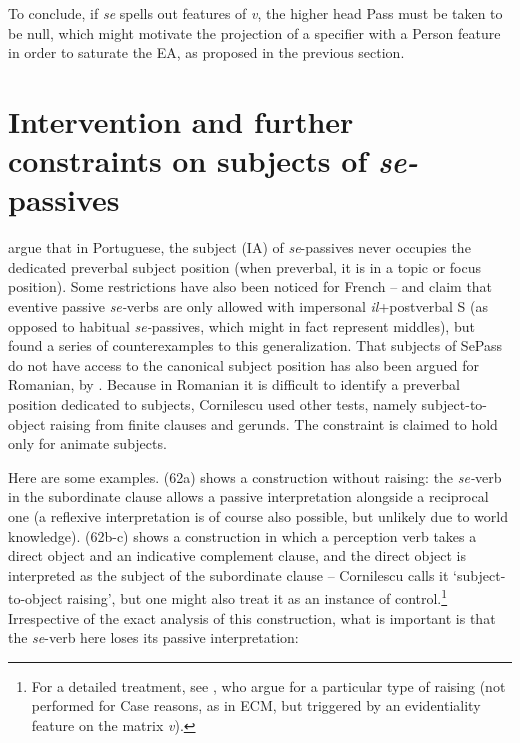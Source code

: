 \documentclass[output=paper]{langsci/langscibook}
\begin{document}
  To conclude, if \textit{se} spells out features of \textit{v}, the higher head Pass must be taken to be null, which might motivate the projection of a specifier with a Person feature in order to saturate the EA, as proposed in the previous section.

\section{Intervention and further constraints on subjects of \textit{se-}passives}%

\citet{Raposo1996} argue that in Portuguese, the subject (IA) of \textit{se}{}-passives never occupies the dedicated preverbal subject position (when preverbal, it is in a topic or focus position). Some restrictions have also been noticed for French – \citet{Stéfanini1962} and \citet{Ruwet1972} claim that eventive passive \textit{se-}verbs are only allowed with impersonal \textit{il}+postverbal S (as opposed to habitual \textit{se-}passives, which might in fact represent middles), but \citet{Zribi-Hertz1982,Zribi-Hertz2008} found a series of counterexamples to this generalization. That subjects of SePass do not have access to the canonical subject position has also been argued for Romanian, by \citet{Cornilescu1998}. Because in Romanian it is difficult to identify a preverbal position dedicated to subjects, Cornilescu used other tests, namely subject-to-object raising from finite clauses and gerunds. The constraint is claimed to hold only for animate subjects.

Here are some examples. (62a) shows a construction without raising: the \textit{se-}verb in the subordinate clause allows a passive interpretation alongside a reciprocal one (a reflexive interpretation is of course also possible, but unlikely due to world knowledge). (62b-c) shows a construction in which a perception verb takes a direct object and an indicative complement clause, and the direct object is interpreted as the subject of the subordinate clause – Cornilescu calls it ‘subject-to-object raising', but one might also treat it as an instance of control.\footnote{For a detailed treatment, see \citet{Alboiu2013,Alboiu2016}, who argue for a particular type of raising (not performed for Case reasons, as in ECM, but triggered by an evidentiality feature on the matrix \textit{v}).} Irrespective of the exact analysis of this construction, what is important is that the \textit{se}{}-verb here loses its passive interpretation:
\end{document}
